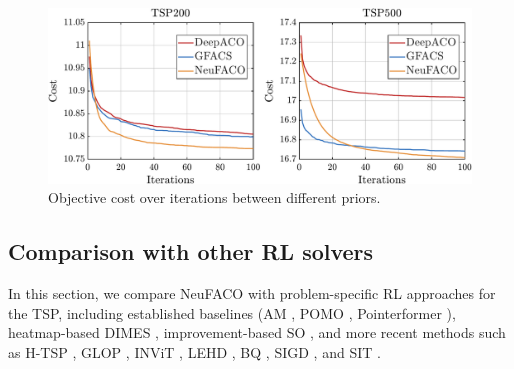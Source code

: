 \documentclass[a4paper,conference]{IEEEtran}
\begin{document}
\begin{figure}[htbp]
  \centering
  \includegraphics[width=\linewidth]{TSP200_vs_TSP500_3lines.pdf}
  \caption{Objective cost over iterations between different priors.}
  \label{fig:over_iterations}
\end{figure}

\subsection{Comparison with other RL solvers}
In this section, we compare NeuFACO with problem-specific RL approaches for the TSP, including established baselines (AM \cite{transformer}, POMO \cite{pomo}, Pointerformer \cite{pointerformer}), heatmap-based DIMES \cite{dimes}, improvement-based SO \cite{SelectAndOptimize}, and more recent methods such as H-TSP \cite{htsp}, GLOP \cite{glop}, INViT \cite{invit}, LEHD \cite{lehd}, BQ \cite{bq}, SIGD \cite{sigd}, and SIT \cite{sit}.

\end{document}
